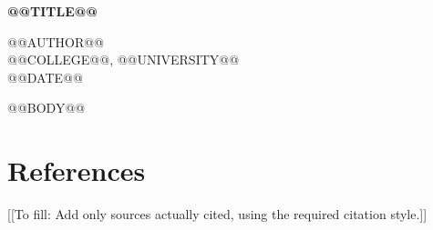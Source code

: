 \documentclass[12pt]{article}
\renewcommand{\missingfield}[1]{\textcolor{red!70!black}{[[To fill: #1]]}}
\begin{document}
\begin{center}
  {\Large\bfseries @@TITLE@@\par}
  \vspace{1em}
  @@AUTHOR@@\\
  @@COLLEGE@@, @@UNIVERSITY@@\\
  @@DATE@@
\end{center}
\vspace{1em}

@@BODY@@

\section*{References}
\missingfield{Add only sources actually cited, using the required citation style.}
\end{document}
